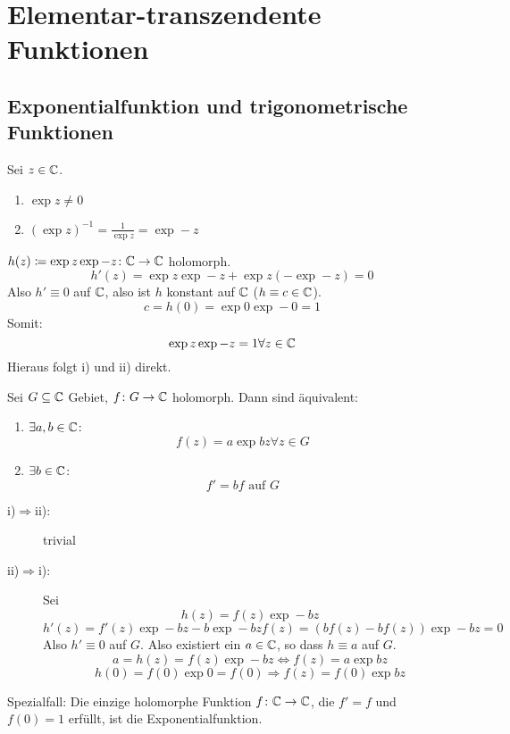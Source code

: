 \chapter{Elementar-transzendente Funktionen}
\section{Exponentialfunktion und trigonometrische Funktionen}
\begin{satz}
	Sei $ z\in\mathbb{C} $.
	\begin{enumerate}
		\item $ \exp z\neq 0 $
		\item $ (\exp z)^{-1}=\frac{1}{\exp z}=\exp -z $
	\end{enumerate}
\end{satz}
\begin{beweis}
	$ h(z)\coloneqq\exp z \exp -z\colon\mathbb{C}\rightarrow\mathbb{C} $ holomorph.
	\[ h'(z)=\exp z\exp -z + \exp z(-\exp -z)=0 \]
	Also $ h'\equiv 0 $ auf $ \mathbb{C} $, also ist $ h $ konstant auf $ \mathbb{C} $ ($ h\equiv c\in\mathbb{C} $).
	\[ c=h(0)=\exp 0\exp -0=1 \]
	Somit:
	\[ \exp z\exp -z=1\forall z\in\mathbb{C} \]
	Hieraus folgt i) und ii) direkt.
\end{beweis}
\newpage
\begin{satz}
	Sei $ G\subseteq\mathbb{C} $ Gebiet, $ f\colon G\rightarrow\mathbb{C} $ holomorph. Dann sind \"aquivalent:
	\begin{enumerate}
		\item $ \exists a,b\in\mathbb{C} $:
		\[ f(z)=a\exp bz\forall z\in G \]
		\item $ \exists b\in\mathbb{C} $:
		\[ f'=bf\text{ auf }G \]
	\end{enumerate}
\end{satz}
\begin{beweis}
	\begin{description}
		\item[i)$ \Rightarrow $ii):] trivial
		\item[ii)$ \Rightarrow $i):] Sei
		\[ h(z)=f(z)\exp -bz \]
		\[ h'(z)=f'(z)\exp -bz - b\exp -bz f(z)=(bf(z)-bf(z))\exp -bz = 0 \]
		Also $ h'\equiv 0 $ auf $ G $. Also existiert ein $ a\in\mathbb{C} $, so dass $ h\equiv a $ auf $ G $.
		\[ a=h(z)=f(z)\exp -bz\Leftrightarrow f(z)=a\exp bz \]
		\[ h(0)=f(0)\exp 0=f(0)\Rightarrow f(z)=f(0)\exp bz \]
	\end{description}
\end{beweis}
Spezialfall: Die einzige holomorphe Funktion $ f\colon\mathbb{C}\rightarrow\mathbb{C} $, die $ f'=f $ und $ f(0)=1 $ erf\"ullt, ist die Exponentialfunktion.\\
